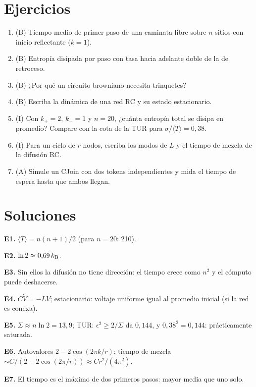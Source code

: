 \documentclass[11pt,a4paper]{article}
\begin{document}
\section{Ejercicios}
\begin{enumerate}[label=\textbf{E\arabic*.}]
\item (B) Tiempo medio de primer paso de una caminata libre sobre $n$ sitios con inicio reflectante ($k=1$).
\item (B) Entropía disipada por paso con tasa hacia adelante doble de la de retroceso.
\item (B) ¿Por qué un circuito browniano necesita trinquetes?
\item (B) Escriba la dinámica de una red RC y su estado estacionario.
\item (I) Con $k_+=2$, $k_-=1$ y $n=20$, ¿cuánta entropía total se disipa en promedio? Compare con la cota de la TUR para $\sigma/\langle T\rangle=0{,}38$.
\item (I) Para un ciclo de $r$ nodos, escriba los modos de $L$ y el tiempo de mezcla de la difusión RC.
\item (A) Simule un CJoin con dos tokens independientes y mida el tiempo de espera hasta que ambos llegan.
\end{enumerate}
\section{Soluciones}
\begin{solucion}
\textbf{E1.} $\langle T\rangle=n(n+1)/2$ (para $n=20$: 210).

\textbf{E2.} $\ln2\approx0{,}69\,k_{\mathrm B}$.

\textbf{E3.} Sin ellos la difusión no tiene dirección: el tiempo crece como $n^2$ y el cómputo puede deshacerse.

\textbf{E4.} $C\dot V=-LV$; estacionario: voltaje uniforme igual al promedio inicial (si la red es conexa).

\textbf{E5.} $\Sigma\approx n\ln2=13{,}9$; TUR: $\epsilon^2\ge2/\Sigma$ da $0{,}144$, y $0{,}38^2=0{,}144$: prácticamente saturada.

\textbf{E6.} Autovalores $2-2\cos(2\pi k/r)$; tiempo de mezcla $\sim C/(2-2\cos(2\pi/r))\approx Cr^2/(4\pi^2)$.

\textbf{E7.} El tiempo es el máximo de dos primeros pasos: mayor media que uno solo.
\end{solucion}
\end{document}
